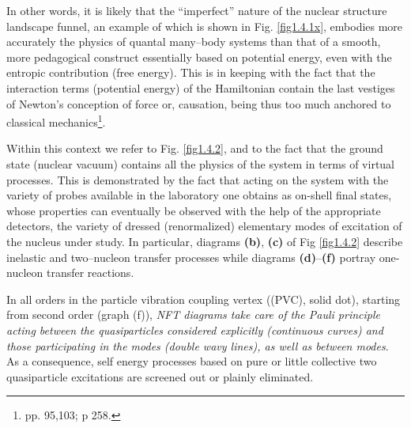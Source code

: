 In other words, it is likely that the ``imperfect'' nature of the nuclear structure landscape funnel, an example of which is shown in Fig. \ref{fig1.4.1x}, embodies more accurately the physics of quantal many--body systems than that of a smooth, more pedagogical construct essentially based on potential energy, even with the entropic contribution (free energy). This is in keeping with the fact that the interaction terms (potential energy) of the Hamiltonian contain the last vestiges of Newton's conception of force or, causation, being thus too much anchored to classical mechanics\footnote{\cite{Born:48} pp. 95,103; \cite{Pais:86} p 258.}.

Within this context we refer to Fig. \ref{fig1.4.2}, and to the fact that the ground state (nuclear vacuum)  contains   all the physics of the system in terms of virtual processes. This is demonstrated by the fact that acting on  the system with the variety of probes available in the laboratory one obtains as on-shell final states, whose properties can eventually be observed with the help of the appropriate detectors, the variety of dressed (renormalized) elementary modes of excitation of the nucleus under study. In particular, diagrams \textbf{(b)}, \textbf{(c)} of Fig \ref{fig1.4.2} describe inelastic and two--nucleon transfer processes while diagrams  \textbf{(d)}--\textbf{(f)} portray  one-nucleon transfer reactions. 


In all orders in the particle vibration coupling vertex ((PVC), solid dot), starting from second order (graph (f)), \textit{NFT diagrams take care of the  Pauli principle acting between the quasiparticles considered explicitly (continuous curves) and those participating in the modes (double wavy lines), as well as between modes}. As a consequence, self energy processes based on pure or  little collective two quasiparticle excitations are  screened out or plainly eliminated.

